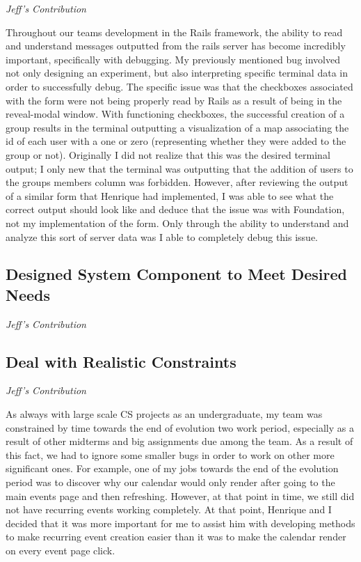 \documentclass[11pt]{article}
\begin{document}
\textit{Jeff's Contribution}

Throughout our teams development in the Rails framework, the ability to read and understand messages outputted from the rails server has become incredibly important, specifically with debugging.  My previously mentioned bug involved not only designing an experiment, but also interpreting specific terminal data in order to successfully debug.  The specific issue was that the checkboxes associated with the form were not being properly read by Rails as a result of being in the reveal-modal window.  With functioning checkboxes, the successful creation of a group results in the terminal outputting a visualization of a map associating the id of each user with a one or zero (representing whether they were added to the group or not).  Originally I did not realize that this was the desired terminal output; I only new that the terminal was outputting that the addition of users to the groups members column was forbidden.  However, after reviewing the output of a similar form that Henrique had implemented, I was able to see what the correct output should look like and deduce that the issue was with Foundation, not my implementation of the form.  Only through the ability to understand and analyze this sort of server data was I able to completely debug this issue.

\subsection{Designed System Component to Meet Desired Needs}

\textit{Jeff's Contribution}

\subsection{Deal with Realistic Constraints}

\textit{Jeff's Contribution}

As always with large scale CS projects as an undergraduate, my team was constrained by time towards the end of evolution two work period, especially as a result of other midterms and big assignments due among the team.  As a result of this fact, we had to ignore some smaller bugs in order to work on other more significant ones.  For example, one of my jobs towards the end of the evolution period was to discover why our calendar would only render after going to the main events page and then refreshing.  However, at that point in time, we still did not have recurring events working completely.  At that point, Henrique and I decided that it was more important for me to assist him with developing methods to make recurring event creation easier than it was to make the calendar render on every event page click.
\end{document}
